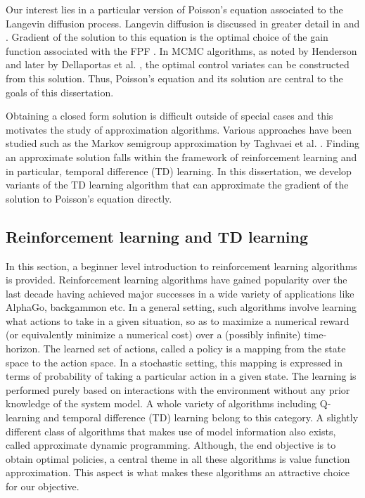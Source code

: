 Our interest lies in a particular version of Poisson's equation associated to the Langevin diffusion process. Langevin diffusion is discussed in greater detail in  and . Gradient of the solution to this equation is the optimal choice of the gain function associated with the FPF \cite{yanmehmey13}. In MCMC algorithms, as noted by Henderson \cite{henthesis97} and later by Dellaportas et al. \cite{delkon12}, the optimal control variates can be constructed from this solution. Thus, Poisson's equation and its solution are central to the goals of this dissertation. 

Obtaining a closed form solution is difficult outside of special cases and this motivates the study of approximation algorithms. Various approaches have been studied such as the Markov semigroup approximation by Taghvaei et al. \cite{tagmeh16a}. Finding an approximate solution falls within the framework of reinforcement learning and in particular, temporal difference (TD) learning. In this dissertation, we develop variants of the TD learning algorithm that can approximate the gradient of the solution to Poisson's equation directly.



\subsection{Reinforcement learning and TD learning}
\label{s:rl_td}
In this section, a beginner level introduction to reinforcement learning algorithms is provided. Reinforcement learning algorithms have gained popularity over the last decade having achieved major successes in a wide variety of applications like AlphaGo, backgammon etc.  In a general setting, such algorithms involve learning what actions to take in a given situation, so as to maximize a numerical reward (or equivalently minimize a numerical cost) over a (possibly infinite) time-horizon. The learned set of actions, called a policy is a mapping from the state space to the action space. In a stochastic setting, this mapping is expressed in terms of probability of taking a particular action in a given state. The learning is performed purely based on interactions with the environment without any prior knowledge of the system model. A whole variety of algorithms including Q-learning \cite{watday92a} and temporal difference (TD) learning \cite{sut88} belong to this category. A slightly different class of algorithms that makes use of model information also exists, called approximate dynamic programming. 
Although, the end objective is to obtain optimal policies, a central theme in all these algorithms is value function approximation. This aspect is what makes these algorithms an attractive choice for our objective. 

